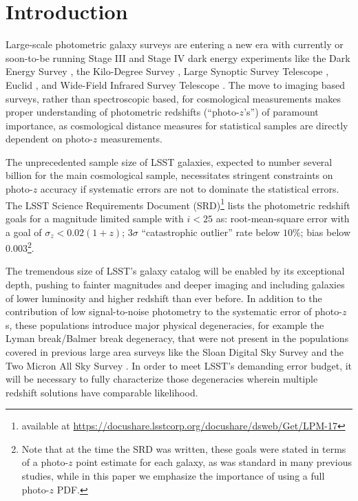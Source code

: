 \section{Introduction}
\label{sec:intro}



Large-scale photometric galaxy surveys are entering a new era with currently or soon-to-be running Stage III and Stage IV dark energy experiments like the Dark Energy Survey \citep[DES,][]{Abbott:05}, the Kilo-Degree Survey \citep[KiDS,][]{de_Jong:13}, Large Synoptic Survey Telescope \citep[LSST,][]{Abell:09}, Euclid \citep{Laureijs:11}, and Wide-Field Infrared Survey Telescope \citep[WFIRST,][]{Green:12}.
The move to imaging based surveys, rather than spectroscopic based, for cosmological measurements makes proper understanding of photometric redshifts (``photo-$z$'s'') of paramount importance, as cosmological distance measures for statistical samples are directly dependent on photo-$z$ measurements.

The unprecedented sample size of LSST galaxies, expected to number several billion for the main cosmological sample, necessitates stringent constraints on photo-$z$ accuracy if systematic errors are not to dominate the statistical errors.
The LSST Science Requirements Document (SRD)\footnote{available at \url{https://docushare.lsstcorp.org/docushare/dsweb/Get/LPM-17}} lists the photometric redshift goals for a magnitude limited sample with $i<25$ as: root-mean-square error with a goal of $\sigma_z<0.02(1+z)$; $3\sigma$ ``catastrophic outlier'' rate below $10\%$; bias below $0.003$\footnote{
Note that at the time the SRD was written, these goals were stated in terms of a photo-$z$ point estimate for each galaxy, as was standard in many previous studies, while in this paper we emphasize the importance of using a full photo-$z$ PDF.}.

The tremendous size of LSST's galaxy catalog will be enabled by its exceptional depth, pushing to fainter magnitudes and deeper imaging and including galaxies of lower luminosity and higher redshift than ever before.
In addition to the contribution of low signal-to-noise photometry to the systematic error of photo-$z$s, these populations introduce major physical degeneracies, for example the Lyman break/Balmer break degeneracy, that were not present in the populations covered in previous large area surveys like the Sloan Digital Sky Survey \citep[SDSS,][]{York:00} and the Two Micron All Sky Survey \citep[2MASS,][]{Skrutskie:06}.
In order to meet LSST's demanding error budget, it will be necessary to fully characterize those degeneracies wherein multiple redshift solutions have comparable likelihood.

